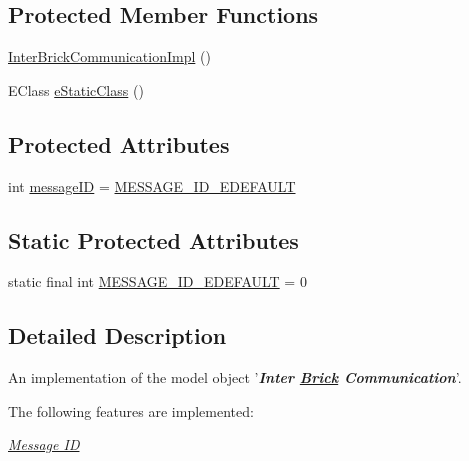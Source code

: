 \subsection*{Protected Member Functions}
\begin{DoxyCompactItemize}
\item 
\hyperlink{classshootingmachineemfmodel_1_1impl_1_1_inter_brick_communication_impl_aeb591229a23e10ce831ec24313db0252}{Inter\-Brick\-Communication\-Impl} ()
\item 
E\-Class \hyperlink{classshootingmachineemfmodel_1_1impl_1_1_inter_brick_communication_impl_a826844356c5bce4482d877775084412c}{e\-Static\-Class} ()
\end{DoxyCompactItemize}
\subsection*{Protected Attributes}
\begin{DoxyCompactItemize}
\item 
int \hyperlink{classshootingmachineemfmodel_1_1impl_1_1_inter_brick_communication_impl_a2b87fd3de3c67ba80aafb38cb48fd455}{message\-I\-D} = \hyperlink{classshootingmachineemfmodel_1_1impl_1_1_inter_brick_communication_impl_a7bc71e77fb5709025d118e5488d34663}{M\-E\-S\-S\-A\-G\-E\-\_\-\-I\-D\-\_\-\-E\-D\-E\-F\-A\-U\-L\-T}
\end{DoxyCompactItemize}
\subsection*{Static Protected Attributes}
\begin{DoxyCompactItemize}
\item 
static final int \hyperlink{classshootingmachineemfmodel_1_1impl_1_1_inter_brick_communication_impl_a7bc71e77fb5709025d118e5488d34663}{M\-E\-S\-S\-A\-G\-E\-\_\-\-I\-D\-\_\-\-E\-D\-E\-F\-A\-U\-L\-T} = 0
\end{DoxyCompactItemize}


\subsection{Detailed Description}
An implementation of the model object '{\itshape {\bfseries Inter \hyperlink{interfaceshootingmachineemfmodel_1_1_brick}{Brick} Communication}}'.

The following features are implemented\-: 
\begin{DoxyItemize}
\item \hyperlink{classshootingmachineemfmodel_1_1impl_1_1_inter_brick_communication_impl_ace5e994ef218bf1074d002ebaef563b0}{{\itshape Message I\-D}} 
\end{DoxyItemize}

